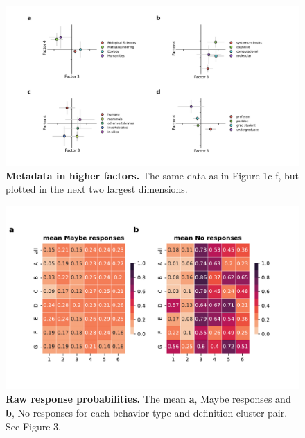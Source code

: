 \documentclass[a4paper, 11pt]{article}
\begin{document}
\begin{figure}
\centerline{\includegraphics[width=\textwidth]{supp_fig4.pdf}}
\caption{\textbf{Metadata in higher factors.} The same data as in Figure 1c-f, but plotted in the next two largest dimensions.}
\end{figure}
\newpage

\begin{figure}
\centerline{\includegraphics[width=\textwidth]{supp_fig5.pdf}}
\caption{\textbf{Raw response probabilities.} The mean \textbf{a}, Maybe responses and \textbf{b}, No responses for each behavior-type and definition cluster pair. See Figure 3.}
\end{figure}
\newpage
\end{document}
